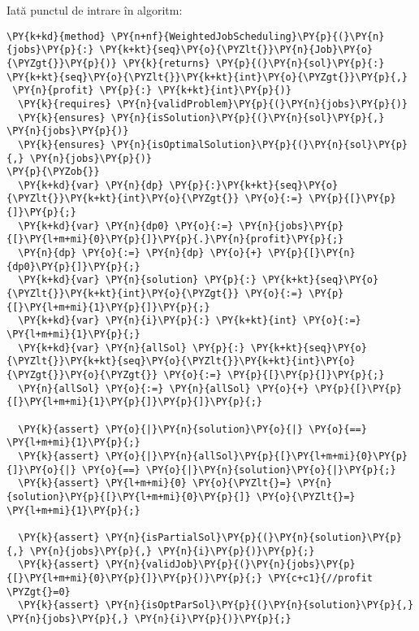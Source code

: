 Iată punctul de intrare în algoritm: 
\begin{Verbatim}[commandchars=\\\{\}, fontsize=\footnotesize]
\PY{k+kd}{method} \PY{n+nf}{WeightedJobScheduling}\PY{p}{(}\PY{n}{jobs}\PY{p}{:} \PY{k+kt}{seq}\PY{o}{\PYZlt{}}\PY{n}{Job}\PY{o}{\PYZgt{}}\PY{p}{)} \PY{k}{returns} \PY{p}{(}\PY{n}{sol}\PY{p}{:} \PY{k+kt}{seq}\PY{o}{\PYZlt{}}\PY{k+kt}{int}\PY{o}{\PYZgt{}}\PY{p}{,}
 \PY{n}{profit} \PY{p}{:} \PY{k+kt}{int}\PY{p}{)}
  \PY{k}{requires} \PY{n}{validProblem}\PY{p}{(}\PY{n}{jobs}\PY{p}{)}
  \PY{k}{ensures} \PY{n}{isSolution}\PY{p}{(}\PY{n}{sol}\PY{p}{,} \PY{n}{jobs}\PY{p}{)}
  \PY{k}{ensures} \PY{n}{isOptimalSolution}\PY{p}{(}\PY{n}{sol}\PY{p}{,} \PY{n}{jobs}\PY{p}{)}
\PY{p}{\PYZob{}}
  \PY{k+kd}{var} \PY{n}{dp} \PY{p}{:}\PY{k+kt}{seq}\PY{o}{\PYZlt{}}\PY{k+kt}{int}\PY{o}{\PYZgt{}} \PY{o}{:=} \PY{p}{[}\PY{p}{]}\PY{p}{;}
  \PY{k+kd}{var} \PY{n}{dp0} \PY{o}{:=} \PY{n}{jobs}\PY{p}{[}\PY{l+m+mi}{0}\PY{p}{]}\PY{p}{.}\PY{n}{profit}\PY{p}{;}
  \PY{n}{dp} \PY{o}{:=} \PY{n}{dp} \PY{o}{+} \PY{p}{[}\PY{n}{dp0}\PY{p}{]}\PY{p}{;}
  \PY{k+kd}{var} \PY{n}{solution} \PY{p}{:} \PY{k+kt}{seq}\PY{o}{\PYZlt{}}\PY{k+kt}{int}\PY{o}{\PYZgt{}} \PY{o}{:=} \PY{p}{[}\PY{l+m+mi}{1}\PY{p}{]}\PY{p}{;} 
  \PY{k+kd}{var} \PY{n}{i}\PY{p}{:} \PY{k+kt}{int} \PY{o}{:=} \PY{l+m+mi}{1}\PY{p}{;}
  \PY{k+kd}{var} \PY{n}{allSol} \PY{p}{:} \PY{k+kt}{seq}\PY{o}{\PYZlt{}}\PY{k+kt}{seq}\PY{o}{\PYZlt{}}\PY{k+kt}{int}\PY{o}{\PYZgt{}}\PY{o}{\PYZgt{}} \PY{o}{:=} \PY{p}{[}\PY{p}{]}\PY{p}{;} 
  \PY{n}{allSol} \PY{o}{:=} \PY{n}{allSol} \PY{o}{+} \PY{p}{[}\PY{p}{[}\PY{l+m+mi}{1}\PY{p}{]}\PY{p}{]}\PY{p}{;}

  \PY{k}{assert} \PY{o}{|}\PY{n}{solution}\PY{o}{|} \PY{o}{==} \PY{l+m+mi}{1}\PY{p}{;}
  \PY{k}{assert} \PY{o}{|}\PY{n}{allSol}\PY{p}{[}\PY{l+m+mi}{0}\PY{p}{]}\PY{o}{|} \PY{o}{==} \PY{o}{|}\PY{n}{solution}\PY{o}{|}\PY{p}{;}
  \PY{k}{assert} \PY{l+m+mi}{0} \PY{o}{\PYZlt{}=} \PY{n}{solution}\PY{p}{[}\PY{l+m+mi}{0}\PY{p}{]} \PY{o}{\PYZlt{}=} \PY{l+m+mi}{1}\PY{p}{;}

  \PY{k}{assert} \PY{n}{isPartialSol}\PY{p}{(}\PY{n}{solution}\PY{p}{,} \PY{n}{jobs}\PY{p}{,} \PY{n}{i}\PY{p}{)}\PY{p}{;}
  \PY{k}{assert} \PY{n}{validJob}\PY{p}{(}\PY{n}{jobs}\PY{p}{[}\PY{l+m+mi}{0}\PY{p}{]}\PY{p}{)}\PY{p}{;} \PY{c+c1}{//profit \PYZgt{}=0}
  \PY{k}{assert} \PY{n}{isOptParSol}\PY{p}{(}\PY{n}{solution}\PY{p}{,} \PY{n}{jobs}\PY{p}{,} \PY{n}{i}\PY{p}{)}\PY{p}{;}


\end{Verbatim}
